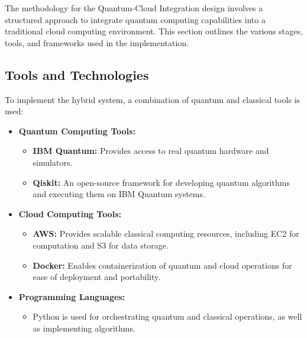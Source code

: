 \documentclass[12pt,a4paper]{article}
\begin{document}
The methodology for the Quantum-Cloud Integration design involves a structured approach to integrate quantum computing capabilities into a traditional cloud computing environment. This section outlines the various stages, tools, and frameworks used in the implementation.

\subsection{Tools and Technologies}
To implement the hybrid system, a combination of quantum and classical tools is used:
\begin{itemize}
    \item \textbf{Quantum Computing Tools:}
    \begin{itemize}
        \item \textbf{IBM Quantum:} Provides access to real quantum hardware and simulators.
        \item \textbf{Qiskit:} An open-source framework for developing quantum algorithms and executing them on IBM Quantum systems.
    \end{itemize}
    \item \textbf{Cloud Computing Tools:}
    \begin{itemize}
        \item \textbf{AWS:} Provides scalable classical computing resources, including EC2 for computation and S3 for data storage.
        \item \textbf{Docker:} Enables containerization of quantum and cloud operations for ease of deployment and portability.
    \end{itemize}
    \item \textbf{Programming Languages:}
    \begin{itemize}
        \item Python is used for orchestrating quantum and classical operations, as well as implementing algorithms.
    \end{itemize}
\end{itemize}
\end{document}
